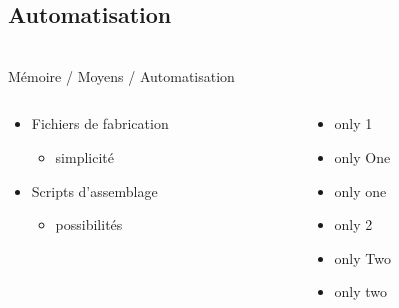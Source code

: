 \subsection{Automatisation}\begin{frame}
{\bititle\\Mémoire / Moyens / Automatisation}
\begin{columns}[c]\begin{column}{.5\textwidth}
\begin{itemize}
\item<1-3> Fichiers de fabrication\begin{itemize}
    \item<2-3> simplicité
    \end{itemize}
\item<4-> Scripts d’assemblage\begin{itemize}
    \item<5-> possibilités
    \end{itemize}
\end{itemize}
\end{column}\begin{column}{.5\textwidth}
\begin{itemize}
\item<3> only 1
\item<3> only One
\item<3> only one
\item<6-> only 2
\item<6-> only Two
\item<6-> only two
\end{itemize}
\end{column}\end{columns}\end{frame}
